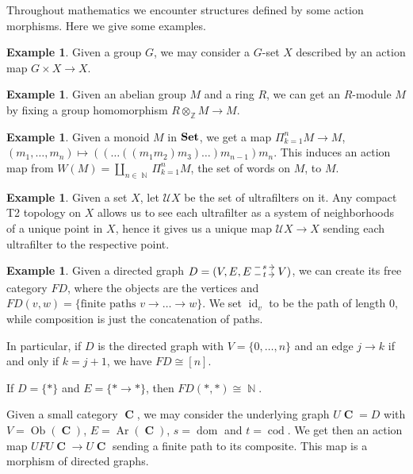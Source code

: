 \documentclass[a4paper,11pt,twoside, openany]{book}
\newcommand{\catname}[1]{{\normalfont\textbf{#1}}}
\newcommand{\Set}{\catname{Set}}
\DeclareMathOperator{\C}{\mathbf{C}}
\DeclareMathOperator{\N}{\mathbb{N}}
\DeclareMathOperator{\Z}{\mathbb{Z}}
\DeclareMathOperator{\id}{id}
\DeclareMathOperator{\dom}{dom}
\DeclareMathOperator{\cod}{cod}
\DeclareMathOperator{\Ob}{Ob}
\DeclareMathOperator{\Ar}{Ar}
\theoremstyle{definition}
\theoremstyle{definition}
\newtheorem{exmp}[thm]{Example} %
\theoremstyle{remark}
\begin{document}
	Throughout mathematics we encounter structures defined by some action morphisms. Here we give some examples.
	
	\begin{exmp}
		Given a group $G$, we may consider a $G$-set $X$ described by an action map $G\times X\rightarrow X$.
	\end{exmp}
	\begin{exmp}
		Given an abelian group $M$ and a ring $R$, we can get an $R$-module $M$ by fixing a group homomorphism $R\otimes_{\Z} M\rightarrow M$.
	\end{exmp}
	\begin{exmp}
		Given a monoid $M$ in $\Set$, we get a map $\Pi_{k=1}^n M\rightarrow M$, $(m_1,\ldots,m_n)\mapsto ((\ldots ((m_1m_2)m_3)\ldots )m_{n-1}) m_n$. This induces an action map from $W(M)=\amalg_{n\in\N}\Pi_{k=1}^n M$, the set of words on $M$, to $M$.
	\end{exmp}
	\begin{exmp}\label{ultrafilters}
		Given a set $X$, let $\mathcal{U}X$ be the set of ultrafilters on it. Any compact T2 topology on $X$ allows us to see each ultrafilter as a system of neighborhoods of a unique point in $X$, hence it gives us a unique map $\mathcal{U}X\rightarrow X$ sending each ultrafilter to the respective point.
	\end{exmp}
	\begin{exmp}
		Given a directed graph $D=(V,E,\hspace{-1.5mm}\begin{tikzcd}
		E\hspace{-1.5mm}\arrow[r, "t" description,  shift right=.5ex, shorten <= .3em, shorten >= .3em]  \arrow[r, "s" description, shift left=1ex, shorten <= .3em, shorten >= .3em] & \hspace{-1.5mm}V
		\end{tikzcd}\hspace{-1.5mm})$, we can create its free category $FD$, where the objects are the vertices and $FD(v,w)=\{\text{finite paths } v\rightarrow\ldots\rightarrow w\}$. We set $\id_v$ to be the path of length 0, while composition is just the concatenation of paths.
		
		In particular, if $D$ is the directed graph with $V=\{0,\ldots,n\}$ and an edge $j\rightarrow k$ if and only if $k=j+1$, we have $FD\cong [n]$.
		
		If $D=\{*\}$ and $E=\{*\rightarrow *\}$, then $FD(*,*)\cong\N$.
		
		Given a small category $\C$, we may consider the underlying graph $U\C=D$ with $V=\Ob(\C)$, $E=\Ar(\C)$, $s=\dom$ and $t=\cod$. We get then an action map $UFU\C\rightarrow U\C$ sending a finite path to its composite. This map is a morphism of directed graphs.
	\end{exmp}
	
\end{document}
